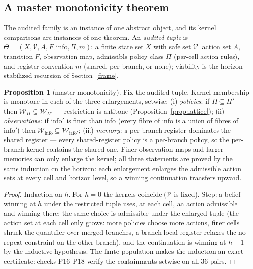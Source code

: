 \documentclass[10pt,twocolumn]{article}
\theoremstyle{definition}
\newtheorem{proposition}{Proposition}
\begin{document}
\subsection{A master monotonicity theorem}\label{mtheorem}

The audited family is an instance of one abstract object, and its
kernel comparisons are instances of one theorem. An \emph{audited
tuple} is
\(\Theta = (X, \mathcal{V}, A, F, \mathrm{info}, \Pi, m)\): a finite
state set \(X\) with safe set \(\mathcal{V}\), action set \(A\),
transition \(F\), observation map, admissible policy class \(\Pi\)
(per-cell action rules), and register convention \(m\) (shared, per-branch,
or none); viability is the horizon-stabilized recursion of
Section~\ref{frame}.

\begin{proposition}[master monotonicity]\label{prop:master}
Fix the audited tuple. Kernel membership is monotone in each of the
three enlargements, setwise: (i) \emph{policies}: if
\(\Pi \subseteq \Pi'\) then
\(\mathcal{W}_{\Pi} \subseteq \mathcal{W}_{\Pi'}\) --- restriction is
antitone (Proposition~\ref{prop:lattice}); (ii) \emph{observations}:
if \(\mathrm{info}'\) is finer than \(\mathrm{info}\) (every fibre of
\(\mathrm{info}\) is a union of fibres of \(\mathrm{info}'\)) then
\(\mathcal{W}_{\mathrm{info}} \subseteq
\mathcal{W}_{\mathrm{info}'}\); (iii) \emph{memory}: a per-branch
register dominates the shared register --- every shared-register policy
is a per-branch policy, so the per-branch kernel contains the shared
one. Finer observation maps and larger memories can only enlarge the
kernel; all three statements are proved by the same induction on the
horizon: each enlargement enlarges the admissible action sets at every
cell and horizon level, so a winning continuation transfers upward.
\end{proposition}

\begin{proof}
Induction on \(h\). For \(h = 0\) the kernels coincide
(\(\mathcal{V}\) is fixed). Step: a belief winning at \(h\) under the
restricted tuple uses, at each cell, an action admissible and winning
there; the same choice is admissible under the enlarged tuple (the
action set at each cell only grows: more policies choose more actions,
finer cells shrink the quantifier over merged branches, a branch-local
register relaxes the no-repeat constraint on the other branch), and the
continuation is winning at \(h-1\) by the inductive hypothesis. The
finite population makes the induction an exact certificate: checks
P16--P18 verify the containments setwise on all \(36\) pairs.
\end{proof}
\end{document}
